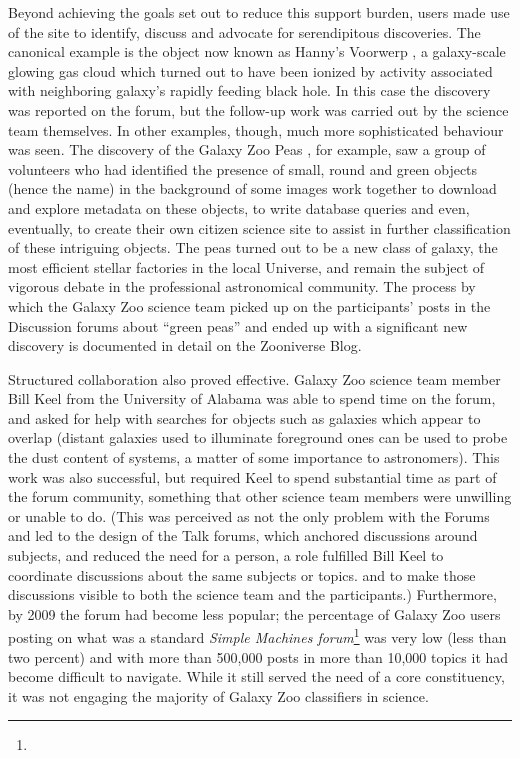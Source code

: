 \documentclass{sigchi}
\begin{document}
  Beyond achieving the goals set out to reduce this support burden, users made use of the site to identify, discuss and advocate for serendipitous discoveries. The canonical example is the object now known as Hanny's Voorwerp \cite{voorwerp}, a galaxy-scale glowing gas cloud which turned out to have been ionized by activity associated with neighboring galaxy's rapidly feeding black hole. In this case the discovery was reported on the forum, but the follow-up work was carried out by the science team themselves. In other examples, though, much more sophisticated behaviour was seen. The discovery of the Galaxy Zoo Peas \cite{Peas}, for example, saw a group of volunteers who had identified the presence of small, round and green objects (hence the name) in the background of some images work together to download and explore metadata on these objects, to write database queries and even, eventually, to create their own citizen science site to assist in further classification of these intriguing objects. The peas turned out to be a new class of galaxy, the most efficient stellar factories in the local Universe, and remain the subject of vigorous debate in the professional astronomical community.  The process by which the Galaxy Zoo science team picked up on the participants' posts in the Discussion forums about ``green peas'' and ended up with a significant new discovery is documented in detail on the Zooniverse Blog\cite{story-of-the-peas}.

Structured collaboration also proved effective. Galaxy Zoo science team member Bill Keel from the University of Alabama was able to spend time on the forum, and asked for help with searches for objects such as galaxies which appear to overlap \cite{overlap} (distant galaxies used to illuminate foreground ones can be used to probe the dust content of systems, a matter of some importance to astronomers). This work was also successful, but required Keel to spend substantial time as part of the forum community, something that other science team members were unwilling or unable to do. (This was perceived as not the only problem with the Forums and led to the design of the Talk forums, which anchored discussions around subjects, and reduced the need for a person, a role fulfilled Bill Keel to coordinate discussions about the same subjects or topics. and to make those discussions visible to both the science team and the participants.) Furthermore, by 2009 the forum had become less popular; the percentage of Galaxy Zoo users posting on what was a standard \emph{Simple Machines forum}\footnote{} was very low (less than two percent) and with more than 500,000 posts in more than 10,000 topics it had become difficult to navigate. While it still served the need of a core constituency, it was not engaging the majority of Galaxy Zoo classifiers in science. 
\end{document}
